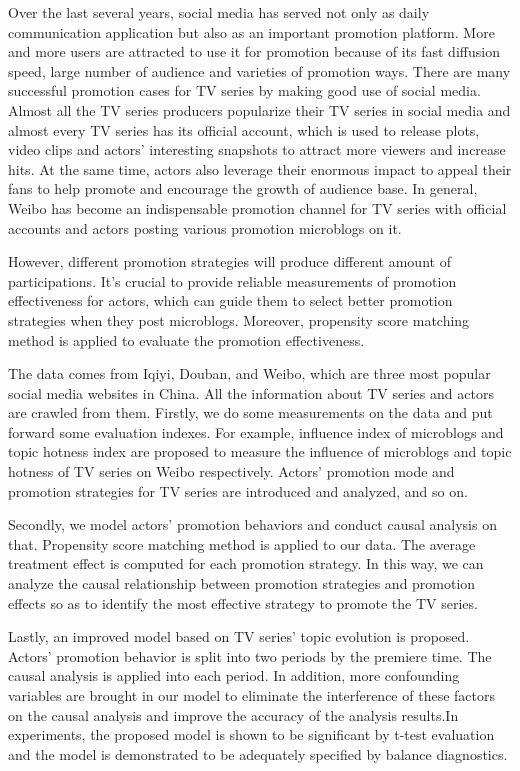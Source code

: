 
\begin{eabstract}

Over the last several years, social media has served not only as daily communication application but also as an important promotion platform. More and more users are attracted to use it for promotion because of its fast diffusion speed, large number of audience and varieties of promotion ways. There are many successful promotion cases for TV series by making good use of social media. Almost all the TV series producers popularize their TV series in social media and almost every TV series has its official account, which is used to release plots, video clips and actors’ interesting snapshots to attract more viewers and increase hits. At the same time, actors also leverage their enormous impact to appeal their fans to help promote and encourage the growth of audience base. In general, Weibo has become an indispensable promotion channel for TV series with official accounts and actors posting various promotion microblogs on it.

However, different promotion strategies will produce different amount of participations. It's crucial to provide reliable measurements of promotion effectiveness for actors, which can guide them to select better promotion strategies when they post microblogs. Moreover, propensity score matching method is applied to evaluate the promotion effectiveness. 

The data comes from Iqiyi, Douban, and Weibo, which are three most popular social media websites in China. All the information about TV series and actors are crawled from them. Firstly, we do some measurements on the data and put forward some evaluation indexes. For example, influence index of microblogs and topic hotness index are proposed to measure the influence of microblogs and topic hotness of TV series on Weibo respectively. Actors' promotion mode and promotion strategies for TV series are introduced and analyzed, and so on.

Secondly, we model actors' promotion behaviors and conduct causal analysis on that. Propensity score matching method is applied to our data. The average treatment effect is computed for each promotion strategy. In this way, we can analyze the causal relationship between promotion strategies and promotion effects so as to identify the most effective strategy to promote the TV series.

Lastly, an improved model based on TV series' topic evolution is proposed. Actors' promotion behavior is split into two periods by the premiere time. The causal analysis is applied into each period. In addition, more confounding variables are brought in our model to eliminate the interference of these factors on the causal analysis and improve the accuracy of the analysis results.In experiments, the proposed model is shown to be significant by t-test evaluation and the model is demonstrated to be adequately specified by balance diagnostics. 

\end{eabstract}


